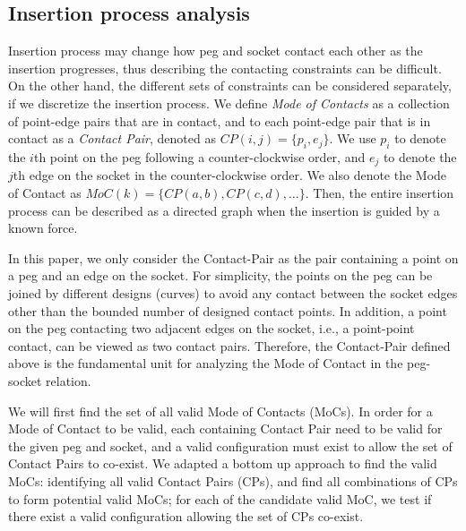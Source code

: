 \documentclass[letterpaper, 10 pt, conference]{ieeeconf}
\begin{document}
\subsection{Insertion process analysis}


Insertion process may change how peg and socket contact each other as the insertion progresses, thus describing the contacting constraints can be difficult. On the other hand, the different sets of constraints can be considered separately, if we discretize the insertion process. We define {\em Mode of Contacts} as a collection of point-edge pairs that are in contact, and to each point-edge pair that is in contact as a {\em Contact Pair}, denoted as $CP(i, j) = \{p_i, e_j\}$. We use $p_i$ to denote the $i$th point on the peg following a counter-clockwise order, and $e_j$ to denote the $j$th edge on the socket in the counter-clockwise order. We also denote the Mode of Contact as $MoC(k) = \{CP(a, b), CP(c, d), \ldots\}$. Then, the entire insertion process can be described as a directed graph when the insertion is guided by a known force. 

In this paper, we only consider the Contact-Pair as the pair containing a point on a peg and an edge on the socket. For simplicity, the points on the peg can be joined by different designs (curves) to avoid any contact between the socket edges other than the bounded number of designed contact points. In addition, a point on the peg contacting two adjacent edges on the socket, i.e., a point-point contact, can be viewed as two contact pairs. Therefore, the Contact-Pair defined above is the fundamental unit for analyzing the Mode of Contact in the peg-socket relation. 

We will first find the set of all valid Mode of Contacts (MoCs). In order for a Mode of Contact to be valid, each containing Contact Pair need to be valid for the given peg and socket, and a valid configuration must exist to allow the set of Contact Pairs to co-exist. We adapted a bottom up approach to find the valid MoCs: identifying all valid Contact Pairs (CPs), and find all combinations of CPs to form potential valid MoCs; for each of the candidate valid MoC, we test if there exist a valid configuration allowing the set of CPs co-exist. 
\end{document}
